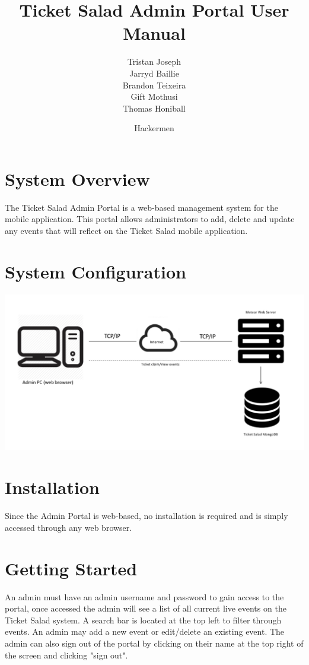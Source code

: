 \documentclass[11pt]{article}
\begin{document}
	\title{Ticket Salad Admin Portal User Manual}
	\date{Hackermen}
		
	\author{Tristan Joseph \\ Jarryd Baillie \\ Brandon Teixeira \\ Gift Mothusi \\ Thomas Honiball }

		
	\maketitle
	\tableofcontents
	\newpage
	
	\section{System Overview}
	The Ticket Salad Admin Portal is a web-based management system for the mobile application. This portal allows administrators to add, delete and update any events that will reflect on the Ticket Salad mobile application.
	
	\section{System Configuration}
	\includegraphics[width=\linewidth]{diagram.png}
	\section{Installation}
	
	Since the Admin Portal is web-based, no installation is required and is simply accessed through any web browser.
	
	\section{Getting Started}
	An admin must have an admin username and password to gain access to the portal, once accessed the admin will see a list of all current live events on the Ticket Salad system. A search bar is located at the top left to filter through events. An admin may add a new event or edit/delete an existing event. The admin can also sign out of the portal by clicking on their name at the top right of the screen and clicking "sign out".
	\\
	\pagebreak
\end{document}
